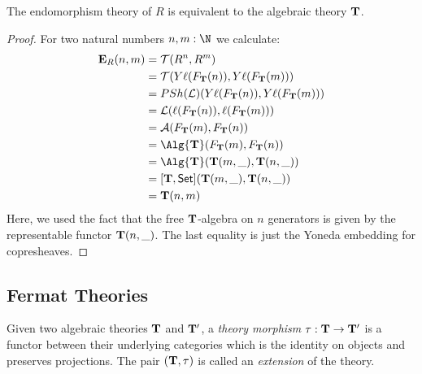 {\begin{proposition}
  The endomorphism theory of \(R\) is equivalent to the algebraic theory \(\mathbf{T}\).
\end{proposition}
\begin{proof}
  For two natural numbers \(n,m:\N\) we calculate:
  \begin{align*}
    \EE_R(n,m)
    &= \cat T(R^n,R^m)\\
    &= \cat T(Y\ell(F_{\TT}(n)),Y\ell(F_{\TT}(m)))\\
    &= \Psh(\cat L)(Y\ell(F_{\TT}(n)),Y\ell(F_{\TT}(m)))\\
    &= \cat L(\ell(F_{\TT}(n)),\ell(F_{\TT}(m)))\\
    & = \cat A(F_{\TT}(m),F_{\TT}(n))\\
    & = \Alg{\TT}(F_{\TT}(m),F_{\TT}(n))\\
    & = \Alg{\TT}(\TT(m,\_),\TT(n,\_))\\
    & = [\TT,\Set](\TT(m,\_),\TT(n,\_))\\
    & = \TT(n,m)
  \end{align*}
Here, we used the fact that the free \(\mathbf{T}\)-algebra on \(n\) generators is given by the representable functor \(\mathbf{T}(n,\_)\).
The last equality is just the Yoneda embedding for copresheaves.
\end{proof}


\subsection{Fermat Theories}

Given two algebraic theories \(\mathbf{T}\) and \(\mathbf{T}'\), a \emph{theory morphism} \(\tau:\mathbf{T}\to\mathbf{T}'\) is a functor between their underlying categories which is the identity on objects and preserves projections.
The pair \((\mathbf{T},\tau)\) is called an \emph{extension} of the theory.


}
